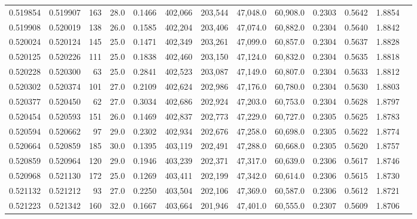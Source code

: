 \begin{tabular}{rrrrrrrrrrrrr}
0.519854 & 0.519907 &   163 & 28.0 &                                     0.1466 & 402,066 & 203,544 &  47,048.0 &  60,908.0 & 0.2303 & 0.5642 & 1.8854 \\
0.519908 & 0.520019 &   138 & 26.0 &                                     0.1585 & 402,204 & 203,406 &  47,074.0 &  60,882.0 & 0.2304 & 0.5640 & 1.8842 \\
0.520024 & 0.520124 &   145 & 25.0 &                                     0.1471 & 402,349 & 203,261 &  47,099.0 &  60,857.0 & 0.2304 & 0.5637 & 1.8828 \\
0.520125 & 0.520226 &   111 & 25.0 &                                     0.1838 & 402,460 & 203,150 &  47,124.0 &  60,832.0 & 0.2304 & 0.5635 & 1.8818 \\
0.520228 & 0.520300 &    63 & 25.0 &                                     0.2841 & 402,523 & 203,087 &  47,149.0 &  60,807.0 & 0.2304 & 0.5633 & 1.8812 \\
0.520302 & 0.520374 &   101 & 27.0 &                                     0.2109 & 402,624 & 202,986 &  47,176.0 &  60,780.0 & 0.2304 & 0.5630 & 1.8803 \\
0.520377 & 0.520450 &    62 & 27.0 &                                     0.3034 & 402,686 & 202,924 &  47,203.0 &  60,753.0 & 0.2304 & 0.5628 & 1.8797 \\
0.520454 & 0.520593 &   151 & 26.0 &                                     0.1469 & 402,837 & 202,773 &  47,229.0 &  60,727.0 & 0.2305 & 0.5625 & 1.8783 \\
0.520594 & 0.520662 &    97 & 29.0 &                                     0.2302 & 402,934 & 202,676 &  47,258.0 &  60,698.0 & 0.2305 & 0.5622 & 1.8774 \\
0.520664 & 0.520859 &   185 & 30.0 &                                     0.1395 & 403,119 & 202,491 &  47,288.0 &  60,668.0 & 0.2305 & 0.5620 & 1.8757 \\
0.520859 & 0.520964 &   120 & 29.0 &                                     0.1946 & 403,239 & 202,371 &  47,317.0 &  60,639.0 & 0.2306 & 0.5617 & 1.8746 \\
0.520968 & 0.521130 &   172 & 25.0 &                                     0.1269 & 403,411 & 202,199 &  47,342.0 &  60,614.0 & 0.2306 & 0.5615 & 1.8730 \\
0.521132 & 0.521212 &    93 & 27.0 &                                     0.2250 & 403,504 & 202,106 &  47,369.0 &  60,587.0 & 0.2306 & 0.5612 & 1.8721 \\
0.521223 & 0.521342 &   160 & 32.0 &                                     0.1667 & 403,664 & 201,946 &  47,401.0 &  60,555.0 & 0.2307 & 0.5609 & 1.8706 \\

\end{tabular}
